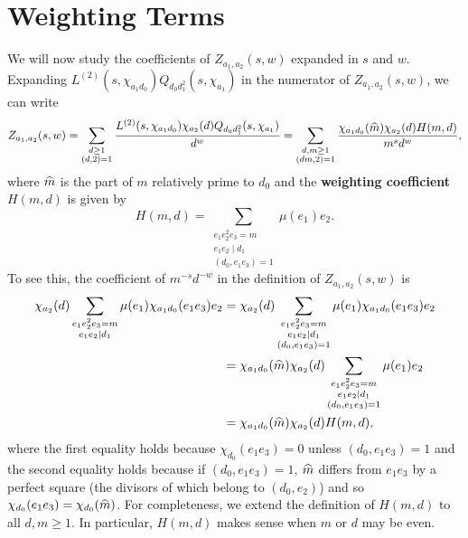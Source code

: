 \documentclass[12pt,reqno,oneside]{amsart}
\begin{document}
\section{Weighting Terms}
    We will now study the coefficients of $Z_{a_{1},a_{2}}(s,w)$ expanded in $s$ and $w$. Expanding $L^{(2)}(s,\chi_{a_{1}d_{0}})Q_{d_{0}d_{1}^{2}}(s,\chi_{a_{1}})$ in the numerator of $Z_{a_{1},a_{2}}(s,w)$, we can write
    \[
        Z_{a_{1},a_{2}}(s,w) = \sum_{\substack{d \ge 1 \\ (d,2) = 1}}\frac{L^{(2)}(s,\chi_{a_{1}d_{0}})\chi_{a_{2}}(d)Q_{d_{0}d_{1}^{2}}(s,\chi_{a_{1}})}{d^{w}} = \sum_{\substack{d,m \ge 1 \\ (dm,2) = 1}}\frac{\chi_{a_{1}d_{0}}(\widehat{m})\chi_{a_{2}}(d)H(m,d)}{m^{s}d^{w}},
    \]
    where $\widehat{m}$ is the part of $m$ relatively prime to $d_{0}$ and the \textbf{weighting coefficient} $H(m,d)$ is given by
    \[
        H(m,d) = \sum_{\substack{e_{1}e_{2}^{2}e_{3} = m \\ e_{1}e_{2} \mid d_{1} \\ (d_{0},e_{1}e_{3}) = 1}}\mu(e_{1})e_{2}.
    \]
    To see this, the coefficient of $m^{-s}d^{-w}$ in the definition of $Z_{a_{1},a_{2}}(s,w)$ is
    \begin{align*}
        \chi_{a_{2}}(d)\sum_{\substack{e_{1}e_{2}^{2}e_{3} = m \\ e_{1}e_{2} \mid d_{1}}}\mu(e_{1})\chi_{a_{1}d_{0}}(e_{1}e_{3})e_{2} &= \chi_{a_{2}}(d)\sum_{\substack{e_{1}e_{2}^{2}e_{3} = m \\ e_{1}e_{2} \mid d_{1} \\ (d_{0},e_{1}e_{3}) = 1}}\mu(e_{1})\chi_{a_{1}d_{0}}(e_{1}e_{3})e_{2} \\
        &= \chi_{a_{1}d_{0}}(\widehat{m})\chi_{a_{2}}(d)\sum_{\substack{e_{1}e_{2}^{2}e_{3} = m \\ e_{1}e_{2} \mid d_{1} \\ (d_{0},e_{1}e_{3}) = 1}}\mu(e_{1})e_{2} \\
        &= \chi_{a_{1}d_{0}}(\widehat{m})\chi_{a_{2}}(d)H(m,d),
    \end{align*}
    where the first equality holds because $\chi_{d_{0}}(e_{1}e_{3}) = 0$ unless $(d_{0},e_{1}e_{3}) = 1$ and the second equality holds because if $(d_{0},e_{1}e_{3}) = 1$, $\widehat{m}$ differs from $e_{1}e_{3}$ by a perfect square (the divisors of which belong to $(d_{0},e_{2})$) and so $\chi_{d_{0}}(e_{1}e_{3}) = \chi_{d_{0}}(\widehat{m})$. For completeness, we extend the definition of $H(m,d)$ to all $d,m \ge 1$. In particular, $H(m,d)$ makes sense when $m$ or $d$ may be even.
    
\end{document}
